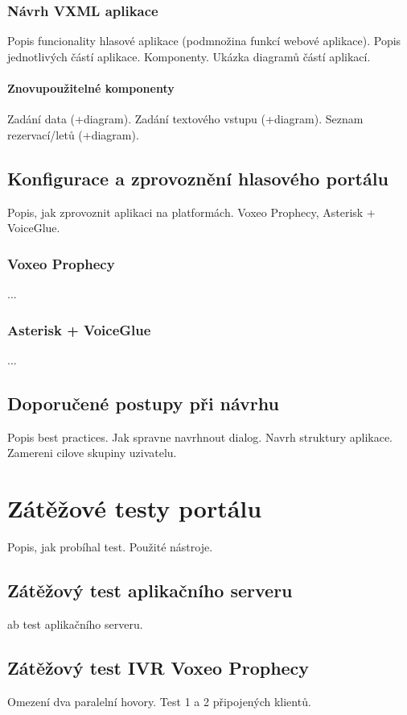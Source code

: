 \documentclass[ing,male,java,dept460]{diploma}						%
\begin{document}
\subsubsection{Návrh VXML aplikace}
Popis funcionality hlasové aplikace (podmnožina funkcí webové aplikace). Popis jednotlivých částí aplikace. Komponenty. Ukázka diagramů částí aplikací.

\paragraph{Znovupoužitelné komponenty}
Zadání data (+diagram). Zadání textového vstupu (+diagram). Seznam rezervací/letů (+diagram).

\subsection{Konfigurace a zprovoznění hlasového portálu}
Popis, jak zprovoznit aplikaci na platformách. Voxeo Prophecy, Asterisk + VoiceGlue.

\subsubsection{Voxeo Prophecy}
...

\subsubsection{Asterisk + VoiceGlue}
...

\subsection{Doporučené postupy při návrhu}
Popis best practices. Jak spravne navrhnout dialog. Navrh struktury aplikace. Zamereni cilove skupiny uzivatelu.

\section{Zátěžové testy portálu}
\label{sec:Benchmark}
Popis, jak probíhal test. Použité nástroje.

\subsection{Zátěžový test aplikačního serveru}
ab test aplikačního serveru.

\subsection{Zátěžový test IVR Voxeo Prophecy}
Omezení dva paralelní hovory. Test 1 a 2 připojených klientů.
\end{document}
